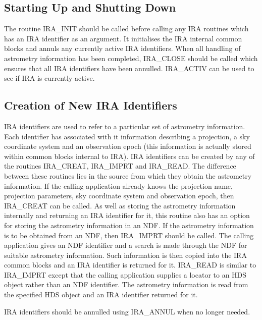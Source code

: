 \subsection {Starting Up and Shutting Down}
The routine IRA\_INIT should be called before calling any IRA routines which has
an IRA identifier as an argument. It initialises the IRA internal common blocks
and annuls any currently active IRA identifiers. When all handling of
astrometry information has been completed, IRA\_CLOSE should be called which
ensures that all IRA identifiers have been annulled. IRA\_ACTIV can be used to
see if IRA is currently active.

\subsection {Creation of New IRA Identifiers}
IRA identifiers are used to refer to a particular set of astrometry information.
Each identifier has associated with it information describing a projection, a
sky coordinate system and an observation epoch (this information is actually
stored within common blocks internal to IRA). IRA identifiers can be created by
any of the routines IRA\_CREAT, IRA\_IMPRT and IRA\_READ. The difference between
these routines lies in the source from which they obtain the astrometry
information. If the calling application already knows the projection name,
projection parameters, sky coordinate system and observation epoch, then
IRA\_CREAT can be called. As well as storing the astrometry information
internally and returning an IRA identifier for it, this routine also has an
option for storing the astrometry information in an NDF. If the astrometry
information is to be obtained from an NDF, then IRA\_IMPRT should be called. The
calling application gives an NDF identifier and a search is made through the NDF
for suitable astrometry information. Such information is then copied into the
IRA common blocks and an IRA identifier is returned for it. IRA\_READ is similar
to IRA\_IMPRT except that the calling application supplies a locator to an HDS
object rather than an NDF identifier. The astrometry information is read from
the specified HDS object and an IRA identifier returned for it.

IRA identifiers should be annulled using IRA\_ANNUL when no longer needed.

